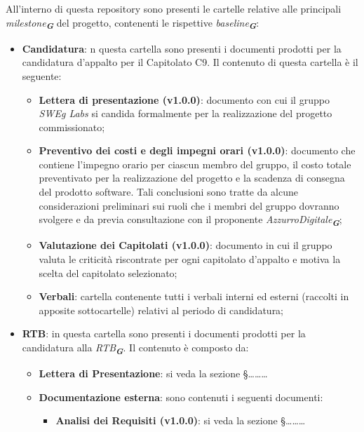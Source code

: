 All’interno di questa repository sono presenti le cartelle relative alle principali \emph{milestone}\textsubscript{\textit{\textbf{G}}}
del progetto, contenenti le rispettive \emph{baseline}\textsubscript{\textit{\textbf{G}}}:
\begin{itemize}
    \item \textbf{Candidatura}: n questa cartella sono presenti i documenti prodotti per la candidatura
    d’appalto per il Capitolato C9. Il contenuto di questa cartella è il seguente:
    \begin{itemize}
        \item \textbf{Lettera di presentazione (v1.0.0)}: documento con cui il gruppo \emph{SWEg Labs} si
        candida formalmente per la realizzazione del progetto commissionato;
        \item \textbf{Preventivo dei costi e degli impegni orari (v1.0.0)}: documento che contiene 
        l’impegno orario per ciascun membro del gruppo, il costo totale preventivato per la
        realizzazione del progetto e la scadenza di consegna del prodotto software. Tali
        conclusioni sono tratte da alcune considerazioni preliminari sui ruoli che i membri
        del gruppo dovranno svolgere e da previa consultazione con il proponente \emph{AzzurroDigitale}\textsubscript{\textit{\textbf{G}}};
        \item \textbf{Valutazione dei Capitolati (v1.0.0)}: documento in cui il gruppo valuta 
        le criticità riscontrate per ogni capitolato d’appalto e motiva la scelta del
        capitolato selezionato;
        \item \textbf{Verbali}: cartella contenente tutti i verbali interni ed esterni (raccolti in apposite sottocartelle)
        relativi al periodo di candidatura;
    \end{itemize}
    \item \textbf{RTB}: in questa cartella sono presenti i documenti prodotti per la candidatura alla \emph{RTB}\textsubscript{\textit{\textbf{G}}}.
    Il contenuto è composto da:
    \begin{itemize}
        \item \textbf{Lettera di Presentazione}: si veda la sezione \S\dots\dots\dots
        \item \textbf{Documentazione esterna}: sono contenuti i seguenti documenti:
        \begin{itemize}
            \item \textbf{Analisi dei Requisiti (v1.0.0)}: si veda la sezione \S\dots\dots\dots

\end{itemize}
\end{itemize}
\end{itemize}

